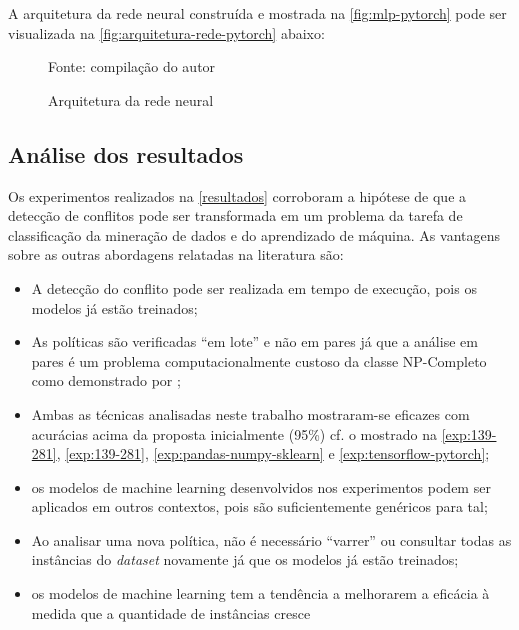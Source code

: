A arquitetura da rede neural construída e mostrada na \autoref{fig:mlp-pytorch} pode ser visualizada na \autoref{fig:arquitetura-rede-pytorch} abaixo:

\begin{figure}[H]
	\centering
	\caption{Arquitetura da rede neural}
	
	\label{fig:arquitetura-rede-pytorch}
	{\scriptsize Fonte: compilação do autor}
\end{figure}

\subsection{Análise dos resultados}\label{analise_resultados}
Os experimentos realizados na \autoref{resultados} corroboram a hipótese de que a detecção de conflitos pode ser transformada em um problema da tarefa de classificação da mineração de dados e do aprendizado de máquina. As vantagens sobre as outras abordagens relatadas na literatura são:
\begin{itemize}
	\item A detecção do conflito pode ser realizada em tempo de execução, pois os modelos já estão treinados;	
	\item As políticas são verificadas ``em lote'' e não em pares já que a análise em pares é um problema computacionalmente custoso da classe NP-Completo como demonstrado por ; 
	\item Ambas as técnicas analisadas neste trabalho mostraram-se eficazes com acurácias acima da proposta inicialmente (95\%) cf. o mostrado na \autoref{exp:139-281}, \autoref{exp:139-281}, \autoref{exp:pandas-numpy-sklearn} e \autoref{exp:tensorflow-pytorch};
	\item os modelos de machine learning desenvolvidos nos experimentos podem ser aplicados em outros contextos, pois são suficientemente genéricos para tal;
	\item Ao analisar uma nova política, não é necessário ``varrer'' ou consultar todas as instâncias do \textit{dataset} novamente já que os modelos já estão treinados;
	\item os modelos de machine learning tem a tendência a melhorarem a eficácia à medida que a quantidade de instâncias cresce
\end{itemize}

